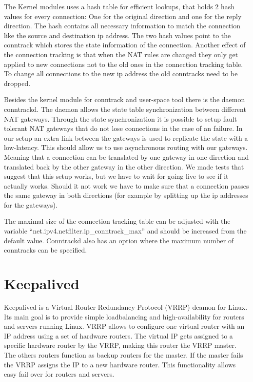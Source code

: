 \documentclass{report}
\begin{document}
The Kernel modules uses a hash table for efficient lookups, that holds 2
hash values for every connection: One for the original direction and one
for the reply direction. The hash contains all necessary information to
match the connection like the source and destination ip address. The two
hash values point to the conntrack which stores the state information of
the connection. Another effect of the connection tracking is that when
the NAT rules are changed they only get applied to new connections not
to the old ones in the connection tracking table. To change all
connections to the new ip address the old conntracks need to be dropped.

Besides the kernel module for conntrack and user-space tool there is the
daemon conntrackd. The daemon allows the state table synchronization
between different NAT gateways. Through the state synchronization it is
possible to setup fault tolerant NAT gateways that do not lose
connections in the case of an failure. In our setup an extra link
between the gateways is used to replicate the state with a low-latency.
This should allow us to use asynchronous routing with our gateways.
Meaning that a connection can be translated by one gateway in one
direction and translated back by the other gateway in the other
direction. We made tests that suggest that this setup works, but we have
to wait for going live to see if it actually works. Should it not work
we have to make sure that a connection passes the same gateway in both
directions (for example by splitting up the ip addresses for the
gateways).

The maximal size of the connection tracking table can be adjusted with
the variable ``net.ipv4.netfilter.ip\_conntrack\_max'' and should be
increased from the default value. Conntrackd also has an option where
the maximum number of conntracks can be specified.

\section{Keepalived}\label{keepalived}

Keepalived\cite{keepalived}  is a Virtual Router Redundancy Protocol (VRRP)\cite{vrrp} deamon
for Linux. Its main goal is to provide simple loadbalancing and
high-availability for routers and servers running Linux. VRRP allows to
configure one virtual router with an IP address using a set of hardware
routers. The virtual IP gets assigned to a specific hardware router by
the VRRP, making this router the VRRP master. The others routers
function as backup routers for the master. If the master fails the VRRP
assigns the IP to a new hardware router. This functionality allows easy
fail over for routers and servers.
\end{document}
